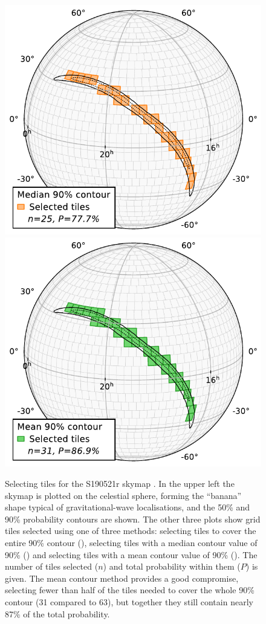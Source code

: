 \begin{colsection}
\begin{figure}[p]
\begin{center}
        \includegraphics[width=0.49\linewidth]{images/tiling/S190521r_3.pdf}
        \includegraphics[width=0.49\linewidth]{images/tiling/S190521r_4.pdf}
    \end{center}
    \caption[Selecting tiles for a gravitational-wave skymap]{
        Selecting tiles for the S190521r skymap \citep[also shown in ]{S190521r}.
        In the upper left the skymap is plotted on the celestial sphere, forming the ``banana'' shape typical of gravitational-wave localisations, and the 50\% and 90\% probability contours are shown.
        The other three plots show grid tiles selected using one of three methods: selecting tiles to cover the entire 90\% contour (), selecting tiles with a median contour value of 90\% () and selecting tiles with a mean contour value of 90\% (). The number of tiles selected ($n$) and total probability within them ($P$) is given.
        The mean contour method provides a good compromise, selecting fewer than half of the tiles needed to cover the whole 90\% contour (31 compared to 63), but together they still contain nearly 87\% of the total probability.
    }\label{fig:selecting_tiles}
\end{figure}

\newpage


\end{colsection}
